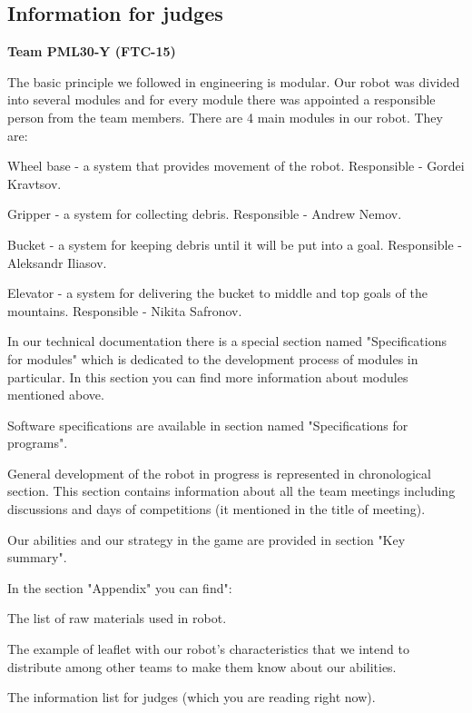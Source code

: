 \subsection{Information for judges}

\large{\textbf{Team PML30-Y (FTC-15)}}

The basic principle we followed in engineering is modular. Our robot was divided into several modules and for every module there was appointed a responsible person from the team members. There are 4 main modules in our robot. They are:

\begin{enumerate*}
	
	\item Wheel base - a system that provides movement of the robot. Responsible - Gordei Kravtsov.
	
	\item Gripper - a system for collecting debris. Responsible - Andrew Nemov.
	
	\item Bucket - a system for keeping debris until it will be put into a goal. Responsible - Aleksandr Iliasov.
	
	\item Elevator - a system for delivering the bucket to middle and top goals of the mountains. Responsible - Nikita Safronov.
	
\end{enumerate*}

In our technical documentation there is a special section named "Specifications for modules" which is dedicated to the development process of modules in particular. In this section you can find more information about modules mentioned above.

Software specifications are available in section named "Specifications for programs".

General development of the robot in progress is represented in chronological section. This section contains information about all the team meetings including discussions and days of competitions (it mentioned in the title of meeting).

Our abilities and our strategy in the game are provided in section "Key summary".

In the section "Appendix" you can find":
\begin{enumerate*}
	\item The list of raw materials used in robot.
	
	\item The example of leaflet with our robot's characteristics that we intend to distribute among other teams to make them know about our abilities.
	
	\item The information list for judges (which you are reading right now).
	
\end{enumerate*}

